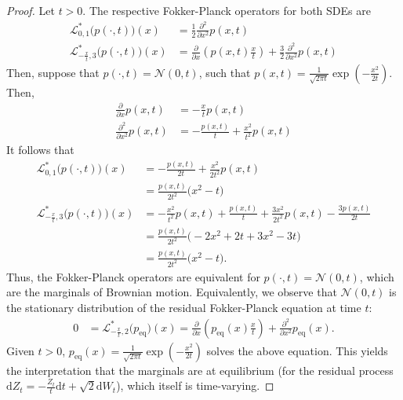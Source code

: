 \documentclass[10pt,a4paper]{amsart}
\newcommand{\dWt}{\mathrm{d}W_t}
\newcommand{\dt}{\mathrm{d}t}
\begin{document}
\begin{proof}
Let $t>0$. The respective Fokker-Planck operators for both SDEs are
\begin{align*}
   \mathcal{L}^*_{0, 1}\bigl(p(\cdot, t)\bigr)(x) &= \frac{1}{2}\frac{\partial^2}{\partial x^2} p(x,t) \\
   \mathcal{L}^*_{-\frac{x}{t}, 3}\bigl(p(\cdot, t)\bigr)(x)&= \frac{\partial}{\partial x}\left(p(x,t) \frac{x}{t}\right) + \frac{3}{2}\frac{\partial^2}{\partial x^2}p(x,t)
\end{align*}
Then, suppose that $p(\cdot, t)=\mathcal{N}(0,t)$, such that $p(x,t) = \frac{1}{\sqrt{2\pi t}} \exp(-\frac{x^2}{2t})$. Then,
\begin{align*}
    \frac{\partial}{\partial x}p(x,t) &= -\frac{x}{t}p(x,t) \\
    \frac{\partial^2}{\partial x^2}p(x,t) &= -\frac{p(x,t)}{t} + \frac{x^2}{t^2}p(x,t)
\end{align*}
It follows that
\begin{align*}
    \mathcal{L}^*_{0, 1}\bigl(p(\cdot, t)\bigr)(x)&=  -\frac{p(x,t)}{2t} + \frac{x^2}{2t^2}p(x,t)\\
    &= \frac{p(x,t)}{2t^2}\bigl(x^2-t \bigr)\\
   \mathcal{L}^*_{-\frac{x}{t}, 3}\bigl(p(\cdot, t)\bigr)(x)&= 
   -\frac{x^2}{t^2}p(x,t) + \frac{p(x,t)}{t} + \frac{3x^2}{2t^2}p(x,t) - \frac{3p(x,t)}{2t}\\
   &= \frac{p(x,t)}{2t^2}\bigl(-2x^2+2t+3x^2 -3t \bigr)\\
   &= \frac{p(x,t)}{2t^2}\bigl(x^2-t\bigr).
\end{align*}
Thus, the Fokker-Planck operators are equivalent for $p(\cdot, t) = \mathcal{N}(0,t)$, which are the marginals of Brownian motion. Equivalently, we observe that $\mathcal{N}(0,t)$ is the stationary distribution of the residual Fokker-Planck equation at time $t$:
\begin{align*}
   0 &= \mathcal{L}^*_{-\frac{x}{t}, 2}\bigl(p_\mathrm{eq}\bigr)(x)= \frac{\partial}{\partial x}\left(p_\mathrm{eq}(x) \frac{x}{t}\right) +\frac{\partial^2}{\partial x^2}p_\mathrm{eq}(x).
\end{align*}
Given $t>0$, $p_\mathrm{eq}(x) = \frac{1}{\sqrt{2\pi t}} \exp(-\frac{x^2}{2t})$ solves the above equation. This yields the interpretation that the marginals are at equilibrium (for the residual process  $\mathrm{d}Z_t = -\frac{Z_t}{t}\dt{} + \sqrt{2}\dWt{}$), which itself is time-varying.
\end{proof}
\end{document}
